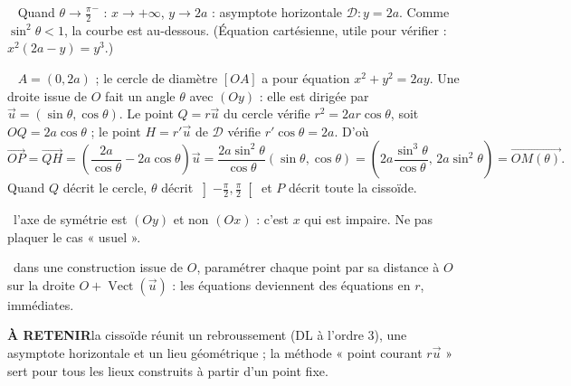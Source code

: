 \documentclass[a4paper,11pt]{article}
\numberwithin{equation}{section}
\numberwithin{figure}{section}
\numberwithin{table}{section}
\theoremstyle{enonce}
\theoremstyle{exemple}
\theoremstyle{remarque}
\newcommand{\vect}{\operatorname{Vect}}
\newcommand{\vv}[1]{\overrightarrow{#1}}
\newcommand{\ve}[1]{\vec{#1}}
\newcommand{\gain}[1]{\par\noindent{\sffamily\bfseries\small\color{Ocre}Astuce.}\ #1\par}
\newcommand{\piege}[1]{\par\noindent{\sffamily\bfseries\small\color{Brique}Piège.}\ #1\par}
\newcommand{\retenir}[1]{\begin{retenirbox}{\sffamily\bfseries\footnotesize\color{Ocre}À RETENIR}\quad #1\end{retenirbox}}
\newcommand{\q}[1]{\par\smallskip\noindent{\sffamily\bfseries\color{Bleu}#1}\ }
\begin{document}
\q{5.} Quand $\theta\to\frac\pi2^-$ : $x\to+\infty$, $y\to2a$ : asymptote horizontale $\mathcal D:y=2a$. Comme $\sin^2\theta<1$, la courbe
est au-dessous. (Équation cartésienne, utile pour vérifier : $x^2(2a-y)=y^3$.)

\q{6.} $A=(0,2a)$ ; le cercle de diamètre $[OA]$ a pour équation $x^2+y^2=2ay$. Une droite issue de $O$ fait un angle $\theta$ avec
$(Oy)$ : elle est dirigée par $\ve u=(\sin\theta,\cos\theta)$. Le point $Q=r\ve u$ du cercle vérifie $r^2=2ar\cos\theta$, soit
$OQ=2a\cos\theta$ ; le point $H=r'\ve u$ de $\mathcal D$ vérifie $r'\cos\theta=2a$. D'où
\[\vv{OP}=\vv{QH}=\left(\frac{2a}{\cos\theta}-2a\cos\theta\right)\ve u=\frac{2a\sin^2\theta}{\cos\theta}(\sin\theta,\cos\theta)
=\left(2a\frac{\sin^3\theta}{\cos\theta},\,2a\sin^2\theta\right)=\vv{OM(\theta)}.\]
Quand $Q$ décrit le cercle, $\theta$ décrit $\left]-\frac\pi2,\frac\pi2\right[$ et $P$ décrit toute la cissoïde.
\begin{center}
\end{center}
\piege{l'axe de symétrie est $(Oy)$ et non $(Ox)$ : c'est $x$ qui est impaire. Ne pas plaquer le cas « usuel ».}
\gain{dans une construction issue de $O$, paramétrer chaque point par sa distance à $O$ sur la droite $O+\vect(\ve u)$ :
les équations deviennent des équations en $r$, immédiates.}
\retenir{la cissoïde réunit un rebroussement (DL à l'ordre 3), une asymptote horizontale et un lieu géométrique ; la méthode
« point courant $r\ve u$ » sert pour tous les lieux construits à partir d'un point fixe.}
\end{document}
